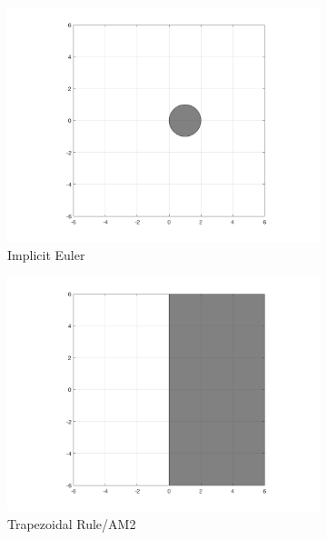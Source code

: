 \documentclass[10pt]{report}
\begin{document}
\begin{enumerate}
\begin{figure}[ht]
\begin{subfigure}[b]{0.25\linewidth}
			\includegraphics[width=\linewidth]{IE.png} 
			\vspace{-5ex}
			\caption*{Implicit Euler}
		\end{subfigure}%
		\begin{subfigure}[b]{0.25\linewidth}
			\centering
			\includegraphics[width=\linewidth]{TR.png} 
			\vspace{-5ex}
			\caption*{Trapezoidal Rule/AM2}
		\end{subfigure}%
		\begin{subfigure}[b]{0.25\linewidth}
			\centering

\end{subfigure}
\end{figure}
\end{enumerate}
\end{document}
